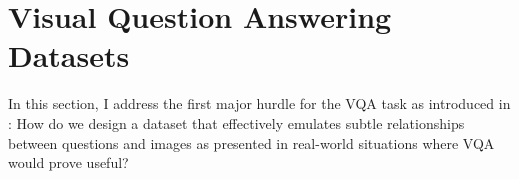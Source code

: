 



\section{Visual Question Answering Datasets}
\label{section:vqa_datasets}

In this section, I address the first major hurdle for the VQA task as introduced in \chapterautorefname{  \ref{chapter:introduction}}: How do we design a dataset that effectively emulates subtle relationships between questions and images as presented in real-world situations where VQA would prove useful?




